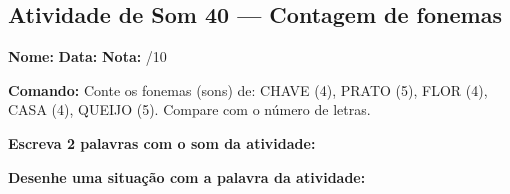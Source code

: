 \subsection{Atividade de Som 40 --- Contagem de fonemas}
\begin{exercicio}



\noindent\textbf{Nome:} \underline{\hspace{3.2cm}} \quad \textbf{Data:} \underline{\hspace{1.6cm}} \quad \textbf{Nota:} \underline{\hspace{0.9cm}}/10


\noindent\textbf{Comando:} Conte os fonemas (sons) de: CHAVE (4), PRATO (5), FLOR (4), CASA (4), QUEIJO (5). Compare com o número de letras.


\begin{center}
\end{center}

\noindent\textbf{Escreva 2 palavras com o som da atividade:}

\begin{center}
  \underline{\hspace{3cm}} \quad \underline{\hspace{3cm}}
\end{center}

\noindent\textbf{Desenhe uma situação com a palavra da atividade:}

\begin{center}
\end{center}

\end{exercicio}




